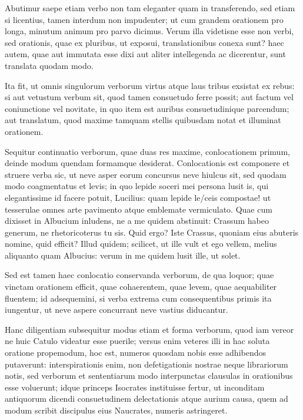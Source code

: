  Abutimur saepe etiam verbo non tam eleganter quam in transferendo, sed etiam si licentius, tamen interdum non impudenter; ut cum grandem orationem pro longa, minutum animum pro parvo dicimus. Verum illa videtisne esse non verbi, sed orationis, quae ex pluribus, ut exposui, translationibus conexa sunt? haec autem, quae aut immutata esse dixi aut aliter intellegenda ac dicerentur, sunt translata quodam modo.

 Ita fit, ut omnis singulorum verborum virtus atque laus tribus exsistat ex rebus: si aut vetustum verbum sit, quod tamen consuetudo ferre possit; aut factum vel coniunctione vel novitate, in quo item est auribus consuetudinique parcendum; aut translatum, quod maxime tamquam stellis quibusdam notat et illuminat orationem.

 Sequitur continuatio verborum, quae duas res maxime, conlocationem primum, deinde modum quendam formamque desiderat. Conlocationis est componere et struere verba sic, ut neve asper eorum concursus neve hiulcus sit, sed quodam modo coagmentatus et levis; in quo lepide soceri mei persona lusit is, qui elegantissime id facere potuit, Lucilius: quam lepide le/ceis compostae! ut tesserulae omnes arte pavimento atque emblemate vermiculato. Quae cum dixisset in Albucium inludens, ne a me quidem abstinuit: Crassum habeo generum, ne rhetoricoterus tu sis. Quid ergo? Iste Crassus, quoniam eius abuteris nomine, quid efficit? Illud quidem; scilicet, ut ille vult et ego vellem, melius aliquanto quam Albucius: verum in me quidem lusit ille, ut solet.

 Sed est tamen haec conlocatio conservanda verborum, de qua loquor; quae vinctam orationem efficit, quae cohaerentem, quae levem, quae aequabiliter fluentem; id adsequemini, si verba extrema cum consequentibus primis ita iungentur, ut neve aspere concurrant neve vastius diducantur.

 Hanc diligentiam subsequitur modus etiam et forma verborum, quod iam vereor ne huic Catulo videatur esse puerile; versus enim veteres illi in hac soluta oratione propemodum, hoc est, numeros quosdam nobis esse adhibendos putaverunt: interspirationis enim, non defetigationis nostrae neque librariorum notis, sed verborum et sententiarum modo interpunctas clausulas in orationibus esse voluerunt; idque princeps Isocrates instituisse fertur, ut inconditam antiquorum dicendi consuetudinem delectationis atque aurium causa, quem ad modum scribit discipulus eius Naucrates, numeris astringeret.

